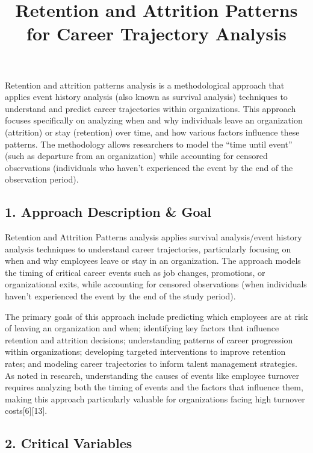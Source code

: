 \documentclass[
  letterpaper,
  DIV=11,
  numbers=noendperiod]{scrartcl}
\title{Retention and Attrition Patterns for Career
Trajectory Analysis}
\author{}
\date{}
\begin{document}
\maketitle


Retention and attrition patterns analysis is a methodological approach
that applies event history analysis (also known as survival analysis)
techniques to understand and predict career trajectories within
organizations. This approach focuses specifically on analyzing when and
why individuals leave an organization (attrition) or stay (retention)
over time, and how various factors influence these patterns. The
methodology allows researchers to model the ``time until event'' (such
as departure from an organization) while accounting for censored
observations (individuals who haven't experienced the event by the end
of the observation period).

\subsection{1. Approach Description \&
Goal}\label{approach-description-goal}

Retention and Attrition Patterns analysis applies survival
analysis/event history analysis techniques to understand career
trajectories, particularly focusing on when and why employees leave or
stay in an organization. The approach models the timing of critical
career events such as job changes, promotions, or organizational exits,
while accounting for censored observations (when individuals haven't
experienced the event by the end of the study period).

The primary goals of this approach include predicting which employees
are at risk of leaving an organization and when; identifying key factors
that influence retention and attrition decisions; understanding patterns
of career progression within organizations; developing targeted
interventions to improve retention rates; and modeling career
trajectories to inform talent management strategies. As noted in
research, understanding the causes of events like employee turnover
requires analyzing both the timing of events and the factors that
influence them, making this approach particularly valuable for
organizations facing high turnover costs{[}6{]}{[}13{]}.

\subsection{2. Critical Variables}\label{critical-variables}
\end{document}
